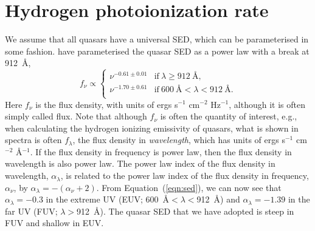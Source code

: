 \documentclass[a4paper,fleqn,usenatbib]{mnras}
\begin{document}
\section{Hydrogen photoionization rate}

We assume that all quasars have a universal SED, which can be
parameterised in some fashion.  \citet{2015MNRAS.449.4204L} have
parameterised the quasar SED as a power law with a break at 912~{\AA},
\begin{equation}
f_\nu\propto\begin{cases}
               \nu^{-0.61\pm 0.01} & \text{if}~\lambda\geq 912~\text{\AA},\\
               \nu^{-1.70\pm 0.61} & \text{if}~600~\text{\AA}<\lambda<912~\text{\AA}.\\                
               \end{cases}
\label{eqn:sed}
\end{equation}
Here $f_\nu$ is the flux density, with units of ergs s$^{-1}$
cm$^{-2}$ Hz$^{-1}$, although it is often simply called flux.  Note
that although $f_\nu$ is often the quantity of interest, e.g., when
calculating the hydrogen ionizing emissivity of quasars, what is shown
in spectra is often $f_\lambda$, the flux density
in \emph{wavelength}, which has units of ergs s$^{-1}$
cm$^{-2}$ \AA$^{-1}$.  If the flux density in frequency is power law,
then the flux density in wavelength is also power law.  The power law
index of the flux density in wavelength, $\alpha_\lambda$, is related
to the power law index of the flux density in frequency, $\alpha_\nu$,
by $\alpha_\lambda=-(\alpha_\nu+2)$.  From Equation~(\ref{eqn:sed}),
we can now see that $\alpha_\lambda=-0.3$ in the extreme UV (EUV;
600~{\AA}$<\lambda<$912~{\AA}) and $\alpha_\lambda=-1.39$ in the far
UV (FUV; $\lambda>$912~{\AA}).  The quasar SED that we have adopted is
steep in FUV and shallow in EUV.
\end{document}

